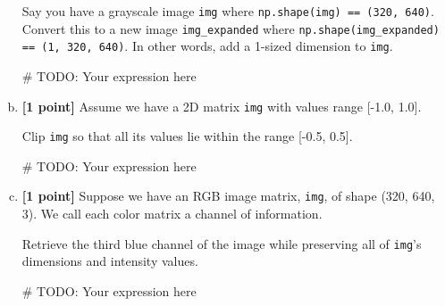 \documentclass[11pt]{article}
\begin{document}
\begin{enumerate}[(a)]
    \begin{tcolorbox}[colback=orange!5!white,colframe=orange!75!black]
    Say you have a grayscale image \texttt{img} where \texttt{np.shape(img) == (320, 640)}. Convert this to a new image \texttt{img\_expanded} where \texttt{np.shape(img\_expanded) == (1, 320, 640)}. In other words, add a 1-sized dimension to \texttt{img}.
    \end{tcolorbox}

\begin{tcolorbox}[colback=white!5!white,colframe=green!75!black,height=2cm]
    \begin{python}
    # TODO: Your expression here
    \end{python}
    \end{tcolorbox}
    
    \item \textbf{[1 point]} Assume we have a 2D matrix \texttt{img} with values range [-1.0, 1.0]. 
    \begin{tcolorbox}[colback=orange!5!white,colframe=orange!75!black]
    Clip \texttt{img} so that all its values lie within the range [-0.5, 0.5].
    \end{tcolorbox}

    \begin{tcolorbox}[colback=white!5!white,colframe=green!75!black,height=2cm]
    \begin{python}
    # TODO: Your expression here
    \end{python}
    \end{tcolorbox}
    
    \item \textbf{[1 point]} Suppose we have an RGB image matrix, \texttt{img}, of shape (320, 640, 3). We call each color matrix a channel of information.
    \begin{tcolorbox}[colback=orange!5!white,colframe=orange!75!black]
    Retrieve the third blue channel of the image while preserving all of \texttt{img}'s dimensions and intensity values.
    \end{tcolorbox}
    
    \begin{tcolorbox}[colback=white!5!white,colframe=green!75!black,height=2cm]
    \begin{python}
    # TODO: Your expression here
    \end{python}
    \end{tcolorbox}


\end{enumerate}
\end{document}
